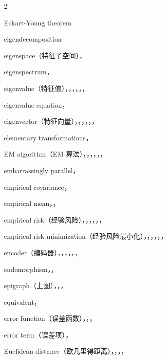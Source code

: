 \begin{multicols}{2}
\medskip{}\par\smallskip
\noindent Eckart-Young theorem\par
\noindent eigendecomposition\par
\noindent eigenspace（特征子空间），\par
\noindent eigenspectrum，\par
\noindent eigenvalue（特征值），，，，，，\par
\noindent eigenvalue equation，\par
\noindent eigenvector（特征向量），，，，，，\par
\noindent elementary transformations，\par
\noindent EM algorithm（EM 算法），，，，，，\par
\noindent embarrassingly parallel，\par
\noindent empirical covariance，\par
\noindent empirical mean，，\par
\noindent empirical risk（经验风险），，，，，，\par
\noindent empirical risk minimization（经验风险最小化），，，，，，\par
\noindent encoder（编码器），，，，，，\par
\noindent endomorphism，，\par
\noindent epigraph（上图），，，\par
\noindent equivalent，\par
\noindent error function（误差函数），，，\par
\noindent error term（误差项），\par
\noindent Euclidean distance（欧几里得距离），，，，\par

\end{multicols}

